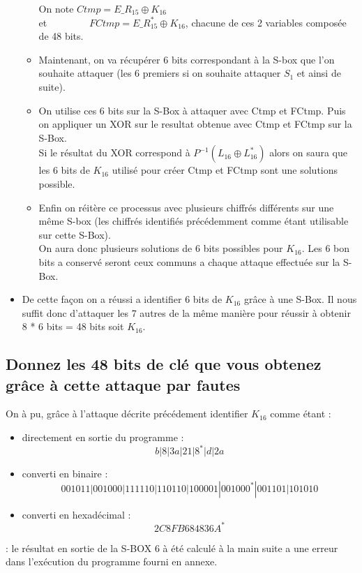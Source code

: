 \documentclass[a4paper,11pt]{article}
\begin{document}
\begin{itemize}
\begin{itemize}
			On note $Ctmp = E\_R_{15} \oplus K_{16}$ \\
			et \ \ \ \ \ \ \ \ $FCtmp = E\_R_{15}^{*} \oplus K_{16}$, chacune de ces 2 variables composée de 48 bits.\\
			\item Maintenant, on va récupérer 6 bits correspondant à la S-box que l'on souhaite attaquer (les 6 premiers si on souhaite attaquer $S_{1}$ et ainsi de suite).
			\item On utilise ces 6 bits sur la S-Box à attaquer avec Ctmp et FCtmp. Puis on appliquer un XOR sur le resultat obtenue avec Ctmp et FCtmp sur la S-Box.\\
			Si le résultat du XOR correspond à  $P^{-1}(L_{16} \oplus L_{16}^{*})$ alors on saura que les 6 bits de $K_{16}$ utilisé pour créer Ctmp et FCtmp sont une solutions possible.
			\item Enfin on réitère ce processus avec plusieurs chiffrés différents sur une même S-box (les chiffrés identifiés précédemment comme étant utilisable sur cette S-Box).\\
			On aura donc plusieurs solutions de 6 bits possibles pour $K_{16}$. Les 6 bon bits a conservé seront ceux communs a chaque attaque effectuée sur la S-Box. 
		\end{itemize}
		\item De cette façon on a réussi a identifier 6 bits de $K_{16}$ grâce à une S-Box. Il nous suffit donc d'attaquer les 7 autres de la même manière pour réussir à obtenir 8 * 6 bits = 48 bits soit $K_{16}$.
	\end{itemize} 
	\subsection{Donnez les 48 bits de clé que vous obtenez grâce à cette attaque par fautes}
	On à pu, grâce à l'attaque décrite précédement identifier $K_{16}$ comme étant :\\
	\begin{itemize}
		\item directement en sortie du programme : $$b|8|3a|21|8^{*}|d|2a$$
		\item converti en binaire : $$001011|001000|111110|110110|100001|001000^{*}|001101|101010$$
		\item converti en hexadécimal : $$2C8FB684836A^{*} $$
	\end{itemize}
	\small * : le résultat en sortie de la S-BOX 6 à été calculé à la main suite a une erreur dans l'exécution du programme fourni en annexe.
	
\end{document}
